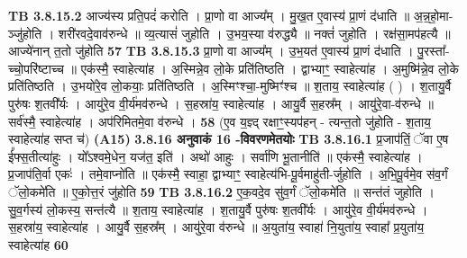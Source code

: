 \documentclass[17pt]{extarticle}
\begin{document}
{{{{{{{{{{{{{{{{{{{{{{                  \newline
                                \textbf{ TB 3.8.15.2} \newline
                  आज्य॑स्य प्रति॒पदं॑ करोति । प्रा॒णो वा आज्य᳚म् । मु॒ख॒त ए॒वास्य॑ प्रा॒णं द॑धाति ॥ अ॒न्न॒हो॒मा-ञ्जु॑होति । शरी॑रवदे॒वाव॑रुन्धे ॥ व्य॒त्यासं॑ जुहोति । उ॒भय॒स्या व॑रुद्ध्यै ॥ नक्तं॑ जुहोति । रक्ष॑सा॒मप॑हत्यै ॥ आज्ये॑नान् त॒तो जु॑होति \textbf{ 57} \newline
                  \newline
                                \textbf{ TB 3.8.15.3} \newline
                  प्रा॒णो वा आज्य᳚म् । उ॒भ॒यत॑ ए॒वास्य॑ प्रा॒णं द॑धाति । पु॒रस्ता᳚-च्चो॒परि॑ष्टाच्च ॥ एक॑स्मै॒ स्वाहेत्या॑ह । अ॒स्मिन्ने॒व लो॒के प्रति॑तिष्ठति । द्वाभ्याꣳ॒॒ स्वाहेत्या॑ह । अ॒मुष्मि॑न्ने॒व लो॒के प्रति॑तिष्ठति । उ॒भयो॑रे॒व लो॒कयाः॒ प्रति॑तिष्ठति । अ॒स्मिꣳश्चा॒-मुष्मिꣳ॑श्च ॥ श॒ताय॒ स्वाहेत्या॑ह ( ) । श॒तायु॒र्वै पुरु॑षः श॒तवी᳚र्यः । आयु॑रे॒व वी॒र्य॑मव॑रुन्धे । स॒हस्रा॑य॒ स्वाहेत्या॑ह । आयु॒र्वै स॒हस्र᳚म् । आयु॑रे॒वा-व॑रुन्धे ॥ सर्व॑स्मै॒ स्वाहेत्या॑ह । अप॑रिमितमे॒वा व॑रुन्धे । \textbf{ 58} \newline
                  \newline
                                    (ए॒व य॒ज्ञ्द् रक्षाꣳ॒॒स्यप॑हन् - त्यन्त॒तो जु॑होति - श॒ताय॒ स्वाहेत्या॑ह सप्त च॑) \textbf{(A15)} \newline \newline
                \textbf{ 3.8.16    अनुवाकं   16 -विवरणमेतयोः} \newline
                                \textbf{ TB 3.8.16.1} \newline
                  प्र॒जाप॑तिं॒ ॅवा ए॒ष ई᳚फ्स॒तीत्या॑हुः । यो᳚ऽश्वमे॒धेन॒ यज॑त॒ इति॑ । अथो॑ आहुः । सर्वा॑णि भू॒तानीति॑ ॥ एक॑स्मै॒ स्वाहेत्या॑ह । प्र॒जाप॑ति॒र्वा एकः॑ । तमे॒वाप्नो॑ति ॥ एक॑स्मै॒ स्वाहा॒ द्वाभ्याꣳ॒॒ स्वाहेत्य॑भि-पू॒र्वमाहु॑ती-र्जुहोति । अ॒भि॒पू॒र्वमे॒व स॑व॒र्गं ॅलो॒कमे॑ति ॥ ए॒को॒त्त॒रं जु॑होति \textbf{ 59} \newline
                  \newline
                                \textbf{ TB 3.8.16.2} \newline
                  ए॒क॒वदे॒व सु॑व॒र्गं ॅलो॒कमे॑ति ॥ सन्त॑तं जुहोति । सु॒व॒र्गस्य॑ लो॒कस्य॒ सन्त॑त्यै ॥ श॒ताय॒ स्वाहेत्या॑ह । श॒तायु॒र्वै पुरु॑षः श॒तवी᳚र्यः । आयु॑रे॒व वी॒र्य॑मव॑रुन्धे । स॒हस्रा॑य॒ स्वाहेत्या॑ह । आयु॒र्वै स॒हस्र᳚म् । आयु॑रे॒वा व॑रुन्धे ॥ अ॒युता॑य॒ स्वाहा॑ नि॒युता॑य॒ स्वाहा᳚ प्र॒युता॑य॒ स्वाहेत्या॑ह \textbf{ 60} \newline
}}}}}}}}}}}}}}}}}}}}}}
\end{document}
